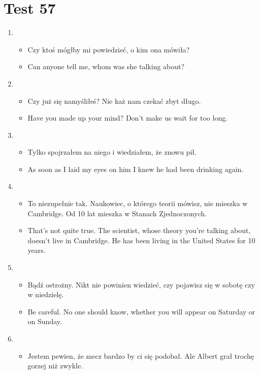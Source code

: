 \documentclass[a4paper]{article}
\begin{document}
\section{Test 57}
\begin{enumerate}
    \item \begin{itemize}
        \item Czy ktoś mógłby mi powiedzieć, o kim ona mówiła?
        \item Can anyone tell me, whom was she talking about?
    \end{itemize}
    \item \begin{itemize}
        \item Czy już się namyśliłeś? Nie każ nam czekać zbyt długo.
        \item Have you made up your mind? Don't make us wait for too long.
    \end{itemize}
    \item \begin{itemize}
        \item Tylko spojrzałem na niego i wiedziałem, że znowu pił.
        \item As soon as I laid my eyes on him I knew he had been drinking again.
    \end{itemize}
    \item \begin{itemize}
        \item To niezupełnie tak. Naukowiec, o którego teorii mówisz, nie mieszka w Cambridge. Od 10 lat mieszka w Stanach Zjednoczonych.
        \item That's not quite true. The scientist, whose theory you're talking about, doesn't live in Cambridge. He has been living in the United States for 10 years.
    \end{itemize}
    \item \begin{itemize}
        \item Bądź ostrożny. Nikt nie powinien wiedzieć, czy pojawisz się w sobotę czy w niedzielę.
        \item Be careful. No one should know, whether you will appear on Saturday or on Sunday.
    \end{itemize}
    \item \begin{itemize}
        \item Jestem pewien, że mecz bardzo by ci się podobał. Ale Albert grał trochę gorzej niż zwykle.

\end{itemize}
\end{enumerate}
\end{document}
